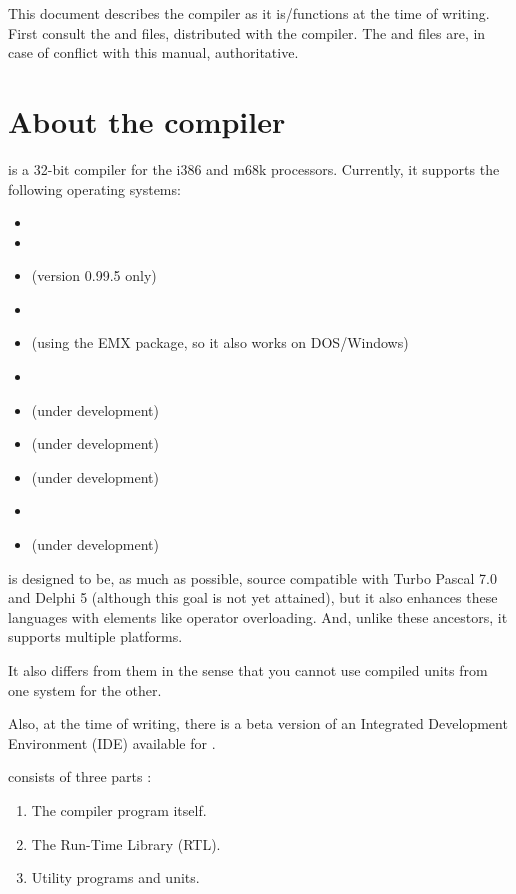 This document describes the compiler as it is/functions at the time of
writing. First consult the  and  files, distributed 
with the compiler. The  and  files are, in case of 
conflict with this manual, authoritative.

\section{About the compiler}
\fpc is a 32-bit compiler for the i386 and m68k processors. Currently, 
it supports the following operating systems:
\begin{itemize}
\item \dos
\item \linux %
\item \amiga (version 0.99.5 only)
\item \windows
\item \ostwo (using the EMX package, so it also works on DOS/Windows)
\item \freebsd
\item \beos (under development)
\item \solaris (under development)
\item \palmos(under development)
\item \netbsd 
\item \openbsd (under development)
\end{itemize}

\fpc is designed to be, as much as possible, source compatible with
Turbo Pascal 7.0 and Delphi 5 (although this goal is not yet attained),
but it also enhances these languages with elements like operator overloading.
And, unlike these ancestors, it supports multiple platforms.

It also differs from them in the sense that you cannot use compiled units
from one system for the other.

Also, at the time of writing, there is a beta version of an
Integrated Development Environment (IDE) available for \fpc.

\fpc consists of three parts :
\begin{enumerate}
\item The compiler program itself.
\item The Run-Time Library (RTL).
\item Utility programs and units.
\end{enumerate}

